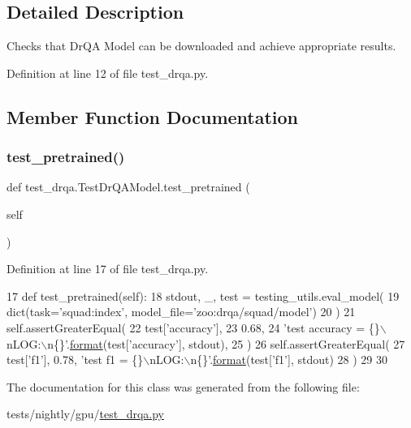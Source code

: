 \subsection{Detailed Description}
\begin{DoxyVerb}Checks that DrQA Model can be downloaded and achieve appropriate results.
\end{DoxyVerb}
 

Definition at line 12 of file test\+\_\+drqa.\+py.



\subsection{Member Function Documentation}
\mbox{\label{classtest__drqa_1_1TestDrQAModel_a7d1c0902015b2a1fb0d208e89c7adb93}} 
\subsubsection{\texorpdfstring{test\+\_\+pretrained()}{test\_pretrained()}}
{\footnotesize\ttfamily def test\+\_\+drqa.\+Test\+Dr\+Q\+A\+Model.\+test\+\_\+pretrained (\begin{DoxyParamCaption}\item[{}]{self }\end{DoxyParamCaption})}



Definition at line 17 of file test\+\_\+drqa.\+py.


\begin{DoxyCode}
17     \textcolor{keyword}{def }test\_pretrained(self):
18         stdout, \_, test = testing\_utils.eval\_model(
19             dict(task=\textcolor{stringliteral}{'squad:index'}, model\_file=\textcolor{stringliteral}{'zoo:drqa/squad/model'})
20         )
21         self.assertGreaterEqual(
22             test[\textcolor{stringliteral}{'accuracy'}],
23             0.68,
24             \textcolor{stringliteral}{'test accuracy = \{\}\(\backslash\)nLOG:\(\backslash\)n\{\}'}.\hyperlink{namespaceparlai_1_1chat__service_1_1services_1_1messenger_1_1shared__utils_a32e2e2022b824fbaf80c747160b52a76}{format}(test[\textcolor{stringliteral}{'accuracy'}], stdout),
25         )
26         self.assertGreaterEqual(
27             test[\textcolor{stringliteral}{'f1'}], 0.78, \textcolor{stringliteral}{'test f1 = \{\}\(\backslash\)nLOG:\(\backslash\)n\{\}'}.\hyperlink{namespaceparlai_1_1chat__service_1_1services_1_1messenger_1_1shared__utils_a32e2e2022b824fbaf80c747160b52a76}{format}(test[\textcolor{stringliteral}{'f1'}], stdout)
28         )
29 
30 
\end{DoxyCode}


The documentation for this class was generated from the following file\+:\begin{DoxyCompactItemize}
\item 
tests/nightly/gpu/\hyperlink{test__drqa_8py}{test\+\_\+drqa.\+py}\end{DoxyCompactItemize}
